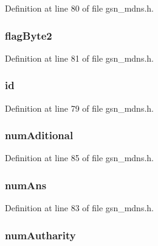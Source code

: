 Definition at line 80 of file gsn\_\-mdns.h.

\hypertarget{a00013_a52dc4745e83026bc6777869962425dc6}{
\subsubsection[{flagByte2}]{ {\bf flagByte2}}}
\label{a00013_a52dc4745e83026bc6777869962425dc6}


Definition at line 81 of file gsn\_\-mdns.h.

\hypertarget{a00013_a31bec522c0189684470da68509e1413e}{
\subsubsection[{id}]{ {\bf id}}}
\label{a00013_a31bec522c0189684470da68509e1413e}


Definition at line 79 of file gsn\_\-mdns.h.

\hypertarget{a00013_a213d75c50c6c0ed507aa2f90dbea4b31}{
\subsubsection[{numAditional}]{ {\bf numAditional}}}
\label{a00013_a213d75c50c6c0ed507aa2f90dbea4b31}


Definition at line 85 of file gsn\_\-mdns.h.

\hypertarget{a00013_a0e367fb69c3999f885676f93c0fb7384}{
\subsubsection[{numAns}]{ {\bf numAns}}}
\label{a00013_a0e367fb69c3999f885676f93c0fb7384}


Definition at line 83 of file gsn\_\-mdns.h.

\hypertarget{a00013_afb2e0e1f63d6234e385007fd62733d4e}{
\subsubsection[{numAutharity}]{ {\bf numAutharity}}}
\label{a00013_afb2e0e1f63d6234e385007fd62733d4e}


